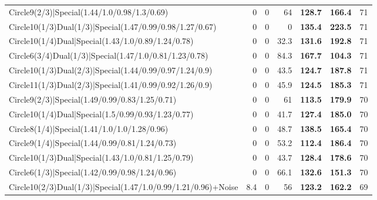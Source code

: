 \begin{tabular}{lrrrllr}
 Circle9(2/3)|Special(1.44/1.0/0.98/1.3/0.69)                   &          0   &            0   &          64   & \textbf{128.7} & \textbf{166.4} &           71 \\
 Circle10(1/3)Dual(1/3)|Special(1.47/0.99/0.98/1.27/0.67)       &          0   &            0   &           0   & \textbf{135.4} & \textbf{223.5} &           71 \\
 Circle10(1/4)Dual|Special(1.43/1.0/0.89/1.24/0.78)             &          0   &            0   &          32.3 & \textbf{131.6} & \textbf{192.8} &           71 \\
 Circle6(3/4)Dual(1/3)|Special(1.47/1.0/0.81/1.23/0.78)         &          0   &            0   &          84.3 & \textbf{167.7} & \textbf{104.3} &           71 \\
 Circle10(1/3)Dual(2/3)|Special(1.44/0.99/0.97/1.24/0.9)        &          0   &            0   &          43.5 & \textbf{124.7} & \textbf{187.8} &           71 \\
 Circle11(1/3)Dual(2/3)|Special(1.41/0.99/0.92/1.26/0.9)        &          0   &            0   &          45.9 & \textbf{124.5} & \textbf{185.3} &           71 \\
 Circle9(2/3)|Special(1.49/0.99/0.83/1.25/0.71)                 &          0   &            0   &          61   & \textbf{113.5} & \textbf{179.9} &           70 \\
 Circle10(1/4)Dual|Special(1.5/0.99/0.93/1.23/0.77)             &          0   &            0   &          41.7 & \textbf{127.4} & \textbf{185.0} &           70 \\
 Circle8(1/4)|Special(1.41/1.0/1.0/1.28/0.96)                   &          0   &            0   &          48.7 & \textbf{138.5} & \textbf{165.4} &           70 \\
 Circle9(1/4)|Special(1.44/0.99/0.81/1.24/0.73)                 &          0   &            0   &          53.2 & \textbf{112.4} & \textbf{186.4} &           70 \\
 Circle10(1/3)Dual|Special(1.43/1.0/0.81/1.25/0.79)             &          0   &            0   &          43.7 & \textbf{128.4} & \textbf{178.6} &           70 \\
 Circle6(1/3)|Special(1.42/0.99/0.98/1.24/0.96)                 &          0   &            0   &          66.1 & \textbf{132.6} & \textbf{151.3} &           70 \\
 Circle10(2/3)Dual(1/3)|Special(1.47/1.0/0.99/1.21/0.96)+Noise  &          8.4 &            0   &          56   & \textbf{123.2} & \textbf{162.2} &           69 \\

\end{tabular}
